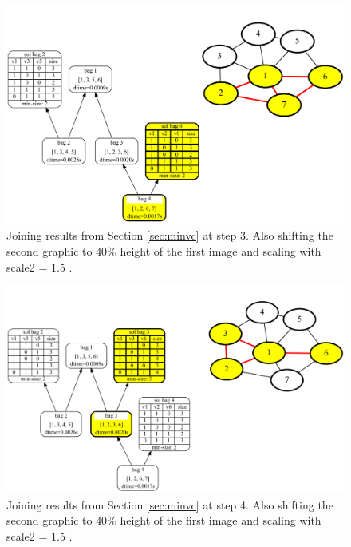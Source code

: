 \documentclass[a4paper, 12pt, bibliography=totoc]{scrartcl}
\begin{document}
\begin{figure}
	\centering
	\includegraphics[width=0.9\linewidth,height=0.9\textheight,keepaspectratio]{images/SVGJOIN/default_06sc153.pdf}
	\caption{Joining results from Section \ref{sec:minvc} at step 3. Also shifting the second graphic to $40\%$ height of the first image and scaling with scale2 = 1.5 .}
	\label{fig:joinscaled3}
\end{figure}
\begin{figure}
	\centering
	\includegraphics[width=0.9\linewidth,height=0.9\textheight,keepaspectratio]{images/SVGJOIN/default_06sc154.pdf}
	\caption{Joining results from Section \ref{sec:minvc} at step 4. Also shifting the second graphic to $40\%$ height of the first image and scaling with scale2 = 1.5 .}
	\label{fig:joinscaled4}
\end{figure}
\end{document}

